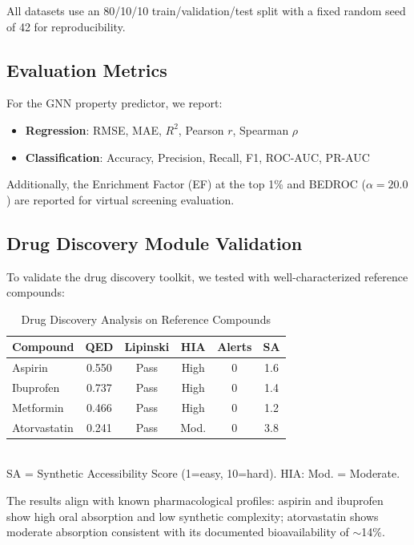\documentclass[conference]{IEEEtran}
\begin{document}
All datasets use an 80/10/10 train/validation/test split with a fixed random seed of 42 for reproducibility.

\subsection{Evaluation Metrics}

For the GNN property predictor, we report:
\begin{itemize}
    \item \textbf{Regression}: RMSE, MAE, $R^2$, Pearson $r$, Spearman $\rho$
    \item \textbf{Classification}: Accuracy, Precision, Recall, F1, ROC-AUC, PR-AUC
\end{itemize}

Additionally, the Enrichment Factor (EF) at the top 1\% and BEDROC ($\alpha = 20.0$) are reported for virtual screening evaluation.

\subsection{Drug Discovery Module Validation}

To validate the drug discovery toolkit, we tested with well-characterized reference compounds:

\begin{table}[h]
\centering
\caption{Drug Discovery Analysis on Reference Compounds}
\label{tab:validation}
\begin{tabular}{@{}lccccc@{}}
\toprule
\textbf{Compound} & \textbf{QED} & \textbf{Lipinski} & \textbf{HIA} & \textbf{Alerts} & \textbf{SA} \\
\midrule
Aspirin       & 0.550 & Pass & High & 0 & 1.6 \\
Ibuprofen     & 0.737 & Pass & High & 0 & 1.4 \\
Metformin     & 0.466 & Pass & High & 0 & 1.2 \\
Atorvastatin  & 0.241 & Pass & Mod. & 0 & 3.8 \\
\bottomrule
\end{tabular}
\\[3pt]
\footnotesize{SA = Synthetic Accessibility Score (1=easy, 10=hard). HIA: Mod. = Moderate.}
\end{table}

The results align with known pharmacological profiles: aspirin and ibuprofen show high oral absorption and low synthetic complexity; atorvastatin shows moderate absorption consistent with its documented bioavailability of $\sim$14\%.
\end{document}
